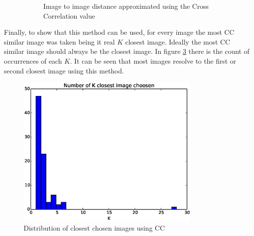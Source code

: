\begin{figure}
\begin{subfigure}[b]{0.60\linewidth}
         \caption{Image to image distance approximated using the Cross Correlation value}                
         \label{fig:CC_confusion_matrix}
  \end{subfigure}
  \caption{}
\end{figure}


Finally, to show that this method can be used, for every image the most CC similar image was taken being it real $K$ closest image. Ideally the most CC similar image should always be the closest image. In figure \ref{fig:K_closest} there is the count of occurrences of each $K$. It can be seen that most images resolve to the first or second closest image using this method.\\

\begin{figure}[!htbp]
  \centering
  \includegraphics[width=9cm]{img/demo_1_1_CC_choose_distribution.eps}
  \caption{Distribution of closest chosen images using CC}
  \label{fig:K_closest}
\end{figure}


